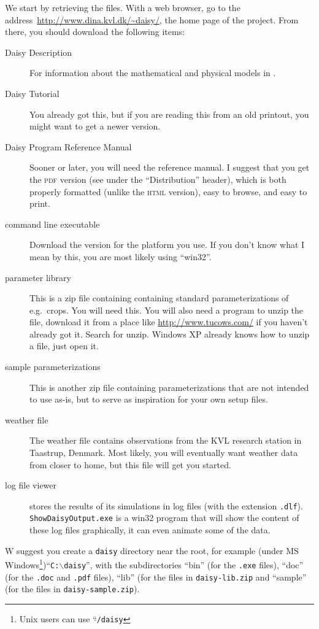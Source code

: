 \documentclass[a4paper,11pt]{article}
\begin{document}
We start by retrieving the files.  With a web browser, go to the
address~\url{http://www.dina.kvl.dk/~daisy/}, the home page of the
\daisy{} project.  From there, you should download the following
items:
\begin{description}
\item[Daisy Description] For information about the mathematical and
  physical models in \daisy{}.
\item[Daisy Tutorial] You already got this, but if you are reading
  this from an old printout, you might want to get a newer version.
\item[Daisy Program Reference Manual] Sooner or later, you will need
  the reference manual.  I suggest that you get the \textsc{pdf}
  version (see under the ``Distribution'' header), which is both
  properly formatted (unlike the \textsc{html} version), easy to
  browse, and easy to print.
\item[command line executable] Download the version for the platform
  you use.  If you don't know what I mean by this, you are most likely
  using ``win32''.
\item[parameter library] This is a zip file containing containing
  standard parameterizations of e.g.\ crops.  You will need this.  You
  will also need a program to unzip the file, download it from a place
  like \url{http://www.tucows.com/} if you haven't already got it.
  Search for unzip.  Windows XP already knows how to unzip a file,
  just open it.
\item[sample parameterizations] This is another zip file containing
  parameterizations that are not intended to use as-is, but to serve
  as inspiration for your own setup files.
\item[weather file] The weather file contains observations from the KVL
  research station in Taastrup, Denmark.  Most likely, you will
  eventually want weather data from closer to home, but this file will
  get you started.
\item[log file viewer] \Daisy{} stores the results of its simulations
  in log files (with the extension \texttt{.dlf}).
  \texttt{ShowDaisyOutput.exe} is a win32 program that will show the
  content of these log files graphically, it can even animate some of
  the data.
\end{description}

W suggest you create a \texttt{daisy} directory near the root, for
example (under MS Windows\footnote{Unix users can use
  ``\texttt{$\tilde{ }$/daisy}})``\texttt{C:$\backslash$daisy}'', with
the subdirectories ``bin'' (for the \texttt{.exe} files), ``doc'' (for
the \texttt{.doc} and \texttt{.pdf} files), ``lib'' (for the files in
\texttt{daisy-lib.zip} and ``sample'' (for the files in
\texttt{daisy-sample.zip}).
\end{document}
